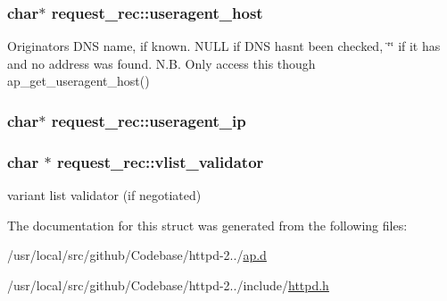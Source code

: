 \subsubsection[{\texorpdfstring{useragent\+\_\+host}{useragent_host}}]{\setlength{\rightskip}{0pt plus 5cm}char$\ast$ request\+\_\+rec\+::useragent\+\_\+host}\hypertarget{structrequest__rec_a04a1c5a299cb3616a873e51d393850bf}{}\label{structrequest__rec_a04a1c5a299cb3616a873e51d393850bf}
Originator\textquotesingle{}s D\+NS name, if known. N\+U\+LL if D\+NS hasn\textquotesingle{}t been checked, \char`\"{}\char`\"{} if it has and no address was found. N.\+B. Only access this though ap\+\_\+get\+\_\+useragent\+\_\+host() 
\subsubsection[{\texorpdfstring{useragent\+\_\+ip}{useragent_ip}}]{\setlength{\rightskip}{0pt plus 5cm}char$\ast$ request\+\_\+rec\+::useragent\+\_\+ip}\hypertarget{structrequest__rec_a335167cb50483f6015c43e727771c1af}{}\label{structrequest__rec_a335167cb50483f6015c43e727771c1af}
\subsubsection[{\texorpdfstring{vlist\+\_\+validator}{vlist_validator}}]{\setlength{\rightskip}{0pt plus 5cm}char $\ast$ request\+\_\+rec\+::vlist\+\_\+validator}\hypertarget{structrequest__rec_a3472fa988698bd4ec9c500ea104cedff}{}\label{structrequest__rec_a3472fa988698bd4ec9c500ea104cedff}
variant list validator (if negotiated) 

The documentation for this struct was generated from the following files\+:\begin{DoxyCompactItemize}
\item 
/usr/local/src/github/\+Codebase/httpd-\/2../\hyperlink{ap_8d}{ap.\+d}\item 
/usr/local/src/github/\+Codebase/httpd-\/2../include/\hyperlink{httpd_8h}{httpd.\+h}\end{DoxyCompactItemize}
